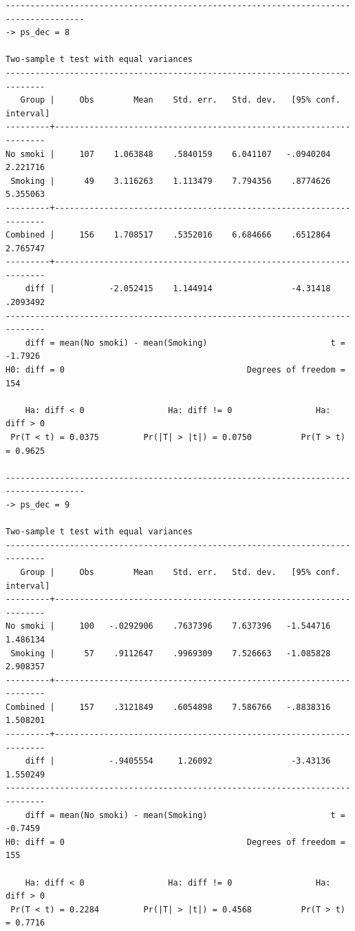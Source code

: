 \documentclass[
  10pt,
  a4paper,
]{book}
\begin{document}
\begin{verbatim}
--------------------------------------------------------------------------------------
-> ps_dec = 8

Two-sample t test with equal variances
------------------------------------------------------------------------------
   Group |     Obs        Mean    Std. err.   Std. dev.   [95% conf. interval]
---------+--------------------------------------------------------------------
No smoki |     107    1.063848    .5840159    6.041107   -.0940204    2.221716
 Smoking |      49    3.116263    1.113479    7.794356    .8774626    5.355063
---------+--------------------------------------------------------------------
Combined |     156    1.708517    .5352016    6.684666    .6512864    2.765747
---------+--------------------------------------------------------------------
    diff |           -2.052415    1.144914                -4.31418    .2093492
------------------------------------------------------------------------------
    diff = mean(No smoki) - mean(Smoking)                         t =  -1.7926
H0: diff = 0                                     Degrees of freedom =      154

    Ha: diff < 0                 Ha: diff != 0                 Ha: diff > 0
 Pr(T < t) = 0.0375         Pr(|T| > |t|) = 0.0750          Pr(T > t) = 0.9625

--------------------------------------------------------------------------------------
-> ps_dec = 9

Two-sample t test with equal variances
------------------------------------------------------------------------------
   Group |     Obs        Mean    Std. err.   Std. dev.   [95% conf. interval]
---------+--------------------------------------------------------------------
No smoki |     100   -.0292906    .7637396    7.637396   -1.544716    1.486134
 Smoking |      57    .9112647    .9969309    7.526663   -1.085828    2.908357
---------+--------------------------------------------------------------------
Combined |     157    .3121849    .6054898    7.586766   -.8838316    1.508201
---------+--------------------------------------------------------------------
    diff |           -.9405554     1.26092                -3.43136    1.550249
------------------------------------------------------------------------------
    diff = mean(No smoki) - mean(Smoking)                         t =  -0.7459
H0: diff = 0                                     Degrees of freedom =      155

    Ha: diff < 0                 Ha: diff != 0                 Ha: diff > 0
 Pr(T < t) = 0.2284         Pr(|T| > |t|) = 0.4568          Pr(T > t) = 0.7716


\end{verbatim}
\end{document}
